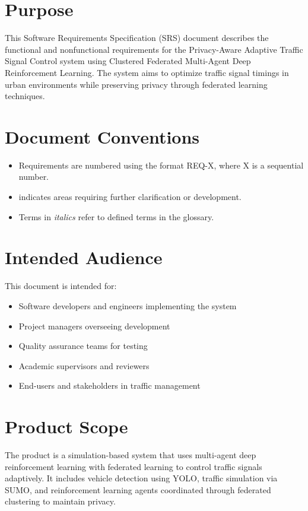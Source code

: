 \section{Purpose}

This Software Requirements Specification (SRS) document describes the functional and nonfunctional requirements for the Privacy-Aware Adaptive Traffic Signal Control system using Clustered Federated Multi-Agent Deep Reinforcement Learning. The system aims to optimize traffic signal timings in urban environments while preserving privacy through federated learning techniques.

\section{Document Conventions}

\begin{itemize}
\item Requirements are numbered using the format REQ-X, where X is a sequential number.
\item [TBD] indicates areas requiring further clarification or development.
\item Terms in \textit{italics} refer to defined terms in the glossary.
\end{itemize}

\section{Intended Audience}

This document is intended for:
\begin{itemize}
\item Software developers and engineers implementing the system
\item Project managers overseeing development
\item Quality assurance teams for testing
\item Academic supervisors and reviewers
\item End-users and stakeholders in traffic management
\end{itemize}

\section{Product Scope}

The product is a simulation-based system that uses multi-agent deep reinforcement learning with federated learning to control traffic signals adaptively. It includes vehicle detection using YOLO, traffic simulation via SUMO, and reinforcement learning agents coordinated through federated clustering to maintain privacy.


